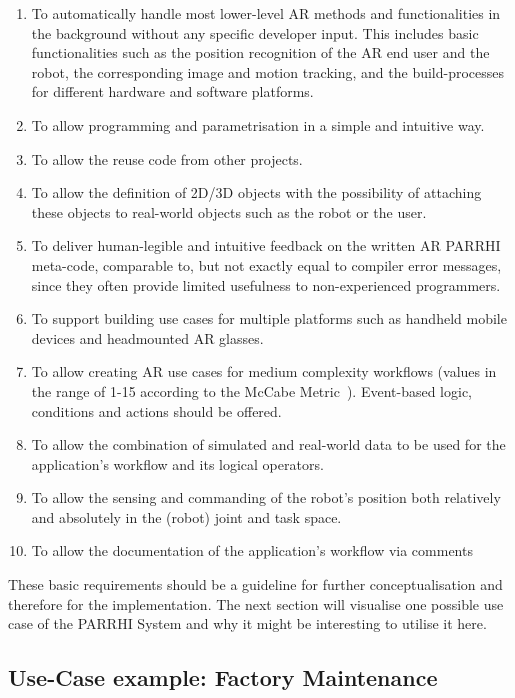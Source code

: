 \begin{enumerate}
	\setlength\itemsep{-1em}
	\item To automatically handle most lower-level AR methods and functionalities in the background without any specific developer input. This includes basic functionalities such as the position recognition of the AR end user and the robot, the corresponding image and motion tracking, and the build-processes for different hardware and software platforms.
	\item To allow programming and parametrisation in a simple and intuitive way.
	\item To allow the reuse code from other projects.
	\item To allow the definition of 2D/3D objects with the possibility of attaching these objects to real-world objects such as the robot or the user.
	\item To deliver human-legible and intuitive feedback on the written AR PARRHI meta-code, comparable to, but not exactly equal to compiler error messages, since they often provide limited usefulness to non-experienced programmers.
	\item To support building use cases for multiple platforms such as handheld mobile devices and headmounted AR glasses.
	\item To allow creating AR use cases for medium complexity workflows (values in the range of 1-15 according to the McCabe Metric~\cite{mccabe1976complexity}). Event-based logic, conditions and actions should be offered.
	\item To allow the combination of simulated and real-world data to be used for the application's workflow and its logical operators.
	\item To allow the sensing and commanding of the robot's position both relatively and absolutely in the (robot) joint and task space.
	\item To allow the documentation of the application's workflow via comments
\end{enumerate}

These basic requirements should be a guideline for further conceptualisation and therefore for the implementation. The next section will visualise one possible use case of the PARRHI System and why it might be interesting to utilise it here.

\subsection{Use-Case example: Factory Maintenance} \label{Section:UseCaseDefinition}

